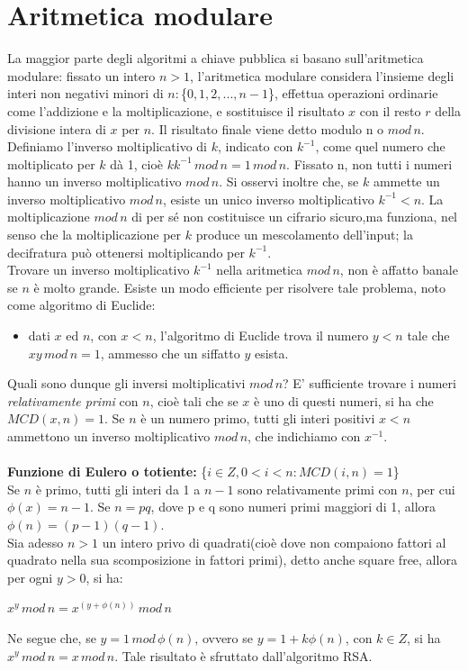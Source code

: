 \section{Aritmetica modulare}
La maggior parte degli algoritmi a chiave pubblica si basano sull'aritmetica modulare: fissato un intero $ n>1 $, l'aritmetica modulare considera l'insieme degli interi non negativi minori di
$n: $\{$0, 1, 2,..., n-1$\}, effettua operazioni ordinarie come l'addizione e la moltiplicazione, e sostituisce il risultato $x$ con il resto $r$ della divisione intera di $x$ per $n$. Il risultato finale viene detto modulo n o $mod \, n$. \\
Definiamo l'inverso moltiplicativo di $k$, indicato con $k^{-1}$, come quel numero che moltiplicato per $k$ dà 1, cioè $kk^{-1} \, mod \, n = 1 \, mod \, n$. Fissato n, non tutti i numeri hanno un inverso moltiplicativo $mod \, n$. Si osservi inoltre che, se $k$ ammette un inverso moltiplicativo $mod \, n $, esiste un unico inverso moltiplicativo $k^{-1} < n$. La moltiplicazione $mod \, n$ di per sé non costituisce un cifrario sicuro,ma funziona, nel senso che la moltiplicazione per $k$ produce un mescolamento dell'input; la decifratura può ottenersi moltiplicando per $k^{-1}$.\\ Trovare un inverso moltiplicativo $k^{-1}$ nella aritmetica $mod \, n$, non è affatto banale se $n$ è molto grande. Esiste un modo efficiente per risolvere tale problema, noto come algoritmo di Euclide: \begin{itemize}
\item dati $x$ ed $n$, con $x<n$, l'algoritmo di Euclide trova il
numero $y<n$ tale che $xy \, mod \, n = 1$, ammesso che un siffatto $y$ esista.\end{itemize} 
Quali sono dunque gli inversi moltiplicativi $mod \, n$? E' sufficiente trovare i numeri \textit{relativamente primi} con $n$, cioè tali che se $x$ è uno di questi numeri, si ha che $MCD(x,n) = 1$. Se $n$ è un numero primo, tutti gli interi positivi $x<n$ ammettono un inverso moltiplicativo $mod \, n$, che indichiamo con $x^{-1}$.\\ \\
\textbf{Funzione di Eulero o totiente:} \{$i \in Z, 0 < i < n: MCD(i,n) = 1$\} \\

Se $n$ è primo, tutti gli interi da 1 a $n-1$ sono relativamente primi con $n$, per cui $\phi(x) = n - 1$. Se $n = pq$, dove p e q sono numeri primi maggiori di 1, allora $\phi(n) = (p-1)(q-1)$. \\
Sia adesso $n > 1$ un intero privo di quadrati(cioè dove non compaiono fattori al quadrato nella sua scomposizione in fattori primi), detto anche square free, allora per ogni $y > 0$, si ha: \begin{center}
$x^y \, mod \, n = x^{(y + \phi(n) )} \, mod \, n$
\end{center} Ne segue che, se $ y = 1 \, mod \, \phi(n) $, ovvero se $y = 1 + k \phi(n) $, con $k \in Z$, si ha $x^y \, mod \, n = x \, mod \, n $. Tale risultato è sfruttato dall'algoritmo RSA.

